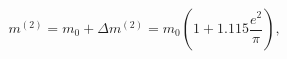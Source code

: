 \begin{equation}
\label{eq16}
m^{(2)} = m_0 + \Delta m^{(2)} = m_0\left(1 + 1.115\frac{e^2}\pi\right),
\end{equation}

